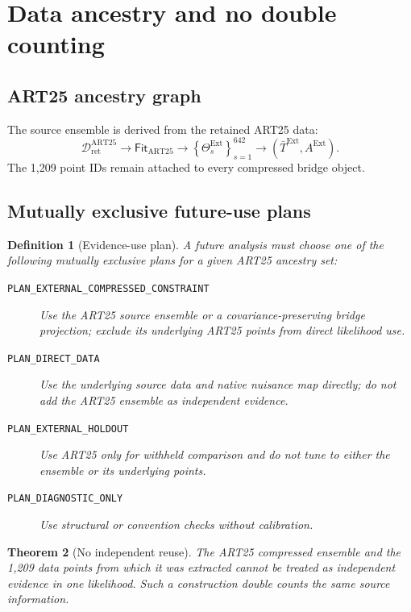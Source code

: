 \documentclass[11pt]{article}
\newtheorem{definition}{Definition}[section]
\newtheorem{theorem}[definition]{Theorem}
\newcommand{\cD}{\mathcal D}
\newcommand{\Ext}{\ensuremath{\mathrm{Ext}}}
\begin{document}
\section{Data ancestry and no double counting}
\label{sec:ancestry}

\subsection{ART25 ancestry graph}

The source ensemble is derived from the retained ART25 data:
\begin{equation}
 \cD_{\mathrm{ret}}^{\mathrm{ART25}}
 \longrightarrow
 \mathsf{Fit}_{\mathrm{ART25}}
 \longrightarrow
 \left\{\Theta_s^{\Ext}\right\}_{s=1}^{642}
 \longrightarrow
 \left(\bar T^{\Ext},A^{\Ext}\right).
 \label{eq:art25-ancestry}
\end{equation}
The 1,209 point IDs remain attached to every compressed bridge object.

\subsection{Mutually exclusive future-use plans}

\begin{definition}[Evidence-use plan]
A future analysis must choose one of the following mutually exclusive plans for a given ART25 ancestry set:
\begin{description}
\item[\texttt{PLAN\_EXTERNAL\_COMPRESSED\_CONSTRAINT}] Use the ART25 source ensemble or a covariance-preserving bridge projection; exclude its underlying ART25 points from direct likelihood use.
\item[\texttt{PLAN\_DIRECT\_DATA}] Use the underlying source data and native nuisance map directly; do not add the ART25 ensemble as independent evidence.
\item[\texttt{PLAN\_EXTERNAL\_HOLDOUT}] Use ART25 only for withheld comparison and do not tune to either the ensemble or its underlying points.
\item[\texttt{PLAN\_DIAGNOSTIC\_ONLY}] Use structural or convention checks without calibration.
\end{description}
\end{definition}

\begin{theorem}[No independent reuse]
The ART25 compressed ensemble and the 1,209 data points from which it was extracted cannot be treated as independent evidence in one likelihood.  Such a construction double counts the same source information.
\end{theorem}
\end{document}
